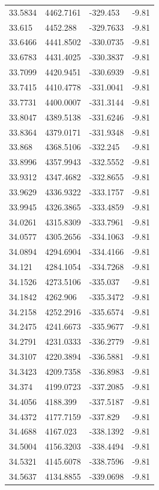 \begin{table}[H]
\begin{tabular}{llll}
33.5834 & 4462.7161 & -329.453 & -9.81 \\
33.615 & 4452.288 & -329.7633 & -9.81 \\
33.6466 & 4441.8502 & -330.0735 & -9.81 \\
33.6783 & 4431.4025 & -330.3837 & -9.81 \\
33.7099 & 4420.9451 & -330.6939 & -9.81 \\
33.7415 & 4410.4778 & -331.0041 & -9.81 \\
33.7731 & 4400.0007 & -331.3144 & -9.81 \\
33.8047 & 4389.5138 & -331.6246 & -9.81 \\
33.8364 & 4379.0171 & -331.9348 & -9.81 \\
33.868 & 4368.5106 & -332.245 & -9.81 \\
33.8996 & 4357.9943 & -332.5552 & -9.81 \\
33.9312 & 4347.4682 & -332.8655 & -9.81 \\
33.9629 & 4336.9322 & -333.1757 & -9.81 \\
33.9945 & 4326.3865 & -333.4859 & -9.81 \\
34.0261 & 4315.8309 & -333.7961 & -9.81 \\
34.0577 & 4305.2656 & -334.1063 & -9.81 \\
34.0894 & 4294.6904 & -334.4166 & -9.81 \\
34.121 & 4284.1054 & -334.7268 & -9.81 \\
34.1526 & 4273.5106 & -335.037 & -9.81 \\
34.1842 & 4262.906 & -335.3472 & -9.81 \\
34.2158 & 4252.2916 & -335.6574 & -9.81 \\
34.2475 & 4241.6673 & -335.9677 & -9.81 \\
34.2791 & 4231.0333 & -336.2779 & -9.81 \\
34.3107 & 4220.3894 & -336.5881 & -9.81 \\
34.3423 & 4209.7358 & -336.8983 & -9.81 \\
34.374 & 4199.0723 & -337.2085 & -9.81 \\
34.4056 & 4188.399 & -337.5187 & -9.81 \\
34.4372 & 4177.7159 & -337.829 & -9.81 \\
34.4688 & 4167.023 & -338.1392 & -9.81 \\
34.5004 & 4156.3203 & -338.4494 & -9.81 \\
34.5321 & 4145.6078 & -338.7596 & -9.81 \\
34.5637 & 4134.8855 & -339.0698 & -9.81 \\

\end{tabular}
\end{table}
